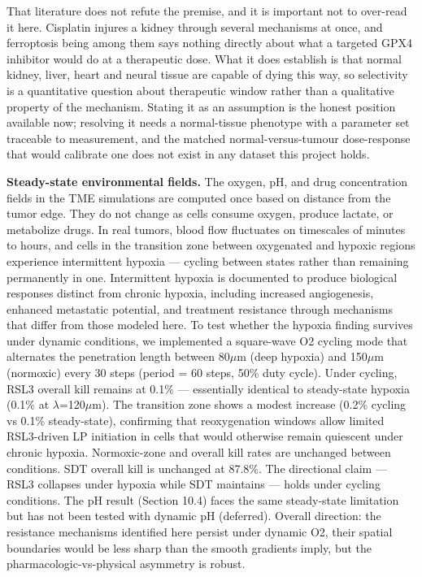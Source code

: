 \documentclass[11pt,twoside,openright]{report}
\begin{document}
That literature does not refute the premise, and it is important not to over-read it here. Cisplatin injures a kidney through several mechanisms at once, and ferroptosis being among them says nothing directly about what a targeted GPX4 inhibitor would do at a therapeutic dose. What it does establish is that normal kidney, liver, heart and neural tissue are capable of dying this way, so selectivity is a quantitative question about therapeutic window rather than a qualitative property of the mechanism. Stating it as an assumption is the honest position available now; resolving it needs a normal-tissue phenotype with a parameter set traceable to measurement, and the matched normal-versus-tumour dose-response that would calibrate one does not exist in any dataset this project holds.

\textbf{Steady-state environmental fields.} The oxygen, pH, and drug concentration fields in the TME simulations are computed once based on distance from the tumor edge. They do not change as cells consume oxygen, produce lactate, or metabolize drugs. In real tumors, blood flow fluctuates on timescales of minutes to hours, and cells in the transition zone between oxygenated and hypoxic regions experience intermittent hypoxia --- cycling between states rather than remaining permanently in one. Intermittent hypoxia is documented to produce biological responses distinct from chronic hypoxia, including increased angiogenesis, enhanced metastatic potential, and treatment resistance through mechanisms that differ from those modeled here. To test whether the hypoxia finding survives under dynamic conditions, we implemented a square-wave O2 cycling mode that alternates the penetration length between 80$\mu$m (deep hypoxia) and 150$\mu$m (normoxic) every 30 steps (period = 60 steps, 50\% duty cycle). Under cycling, RSL3 overall kill remains at 0.1\% --- essentially identical to steady-state hypoxia (0.1\% at $\lambda$=120$\mu$m). The transition zone shows a modest increase (0.2\% cycling vs 0.1\% steady-state), confirming that reoxygenation windows allow limited RSL3-driven LP initiation in cells that would otherwise remain quiescent under chronic hypoxia. Normoxic-zone and overall kill rates are unchanged between conditions. SDT overall kill is unchanged at 87.8\%. The directional claim --- RSL3 collapses under hypoxia while SDT maintains --- holds under cycling conditions. The pH result (Section 10.4) faces the same steady-state limitation but has not been tested with dynamic pH (deferred). Overall direction: the resistance mechanisms identified here persist under dynamic O2, their spatial boundaries would be less sharp than the smooth gradients imply, but the pharmacologic-vs-physical asymmetry is robust.
\end{document}
